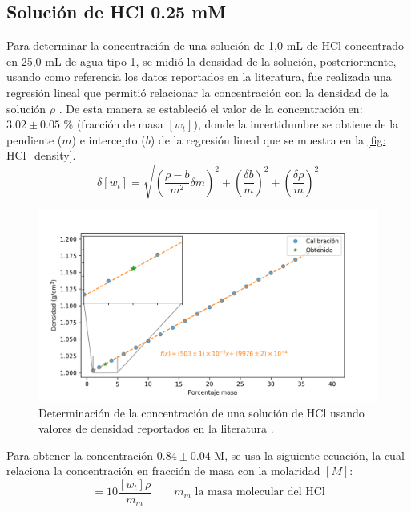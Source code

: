 	\subsection{Soluci\'on de HCl 0.25 mM}
		Para determinar la concentraci\'on de una soluci\'on de 1,0 mL de HCl concentrado en 25,0 mL de agua tipo 1, se midi\'o la densidad de la soluci\'on, posteriormente, usando como referencia los datos reportados en la literatura, fue realizada una regresi\'on lineal que permiti\'o relacionar la concentraci\'on con la densidad de la soluci\'on $\rho$ \cite{perry2007perry}. De esta manera se estableci\'o el valor de la concentraci\'on en: $3.02 \pm 0.05$ \% (fracci\'on de masa $[w_t]$), donde la incertidumbre se obtiene de la pendiente ($m$) e intercepto ($b$) de la regresi\'on lineal que se muestra en la \autoref{fig: HCl_density}.
		\begin{equation}
			\delta [w_t] = \sqrt{\left(\dfrac{\rho-b}{m^2}\delta m\right)^2 + \left(\dfrac{\delta b}{m}\right)^2 + \left(\dfrac{\delta \rho}{m}\right)^2}
		\end{equation}
		\begin{figure}[h]
			\centering
			\includegraphics[width=\linewidth]{../Data/Concentration/C_HCl_initial.png}
			\caption{Determinaci\'on de la concentraci\'on de una soluci\'on de HCl usando valores de densidad reportados en la literatura \cite{perry2007perry}.}
			\label{fig: HCl_density}
		\end{figure}
		
		Para obtener la concentraci\'on $0.84 \pm 0.04$ M, se usa la siguiente ecuaci\'on, la cual relaciona la concentraci\'on en fracci\'on de masa con la molaridad $[M]$:
		\begin{equation}
			[M] = 10\dfrac{[w_t]\rho}{m_m} \qquad \text{$m_m$ la masa molecular del HCl}
		\end{equation}
		
